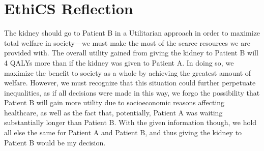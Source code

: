 \documentclass[11pt]{scrartcl}
\theoremstyle{dotlessP}
\theoremstyle{dotlessN}
\begin{document}
\section{EthiCS Reflection}
The kidney should go to Patient B in a Utilitarian approach in order to maximize total welfare in society---we must make the most of the scarce resources we are provided with. The overall utility gained from giving the kidney to Patient B will 4 QALYs more than if the kidney was given to Patient A. In doing so, we maximize the benefit to society as a whole by achieving the greatest amount of welfare. However, we must recognize that this situation could further perpetuate inequalities, as if all decisions were made in this way, we forgo the possibility that Patient B will gain more utility due to socioeconomic reasons affecting healthcare, as well as the fact that, potentially, Patient A was waiting substantially longer than Patient B. With the given information though, we hold all else the same for Patient A and Patient B, and thus giving the kidney to Patient B would be my decision.
\end{document}
